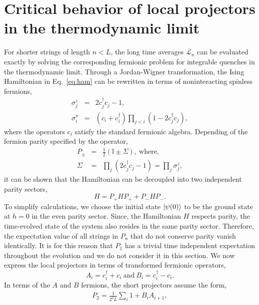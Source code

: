 \documentclass[aps,prx,twocolumn]{revtex4-2}
\begin{document}
{{\section{Critical behavior of local projectors in the thermodynamic limit}
\label{Sec:A3}

For shorter strings of length $n<L$, the long time averages $\overline{\mathcal{L}}_n$ can be evaluated exactly by solving the corresponding fermionic problem for integrable quenches in the thermodynamic limit. Through a Jordan-Wigner transformation, the Ising Hamiltonian in Eq.~\eqref{eq:ham} can be rewritten in terms of noninteracting spinless fermions,
\begin{eqnarray}
	\sigma^z_j&=&2c^{\dagger}_{j}c_j-1,\nonumber\\
	\sigma^x_i&=&\left( c_i+c_i^{\dagger}\right)\prod\limits_{j<i}\left(1-2c_j^{\dagger} c_j\right),
\end{eqnarray}
where the operators $c_i$ satisfy the standard fermionic algebra. Depending of the fermion parity specified by the operator,
\begin{eqnarray}
	P_{\pm}&=&\frac{1}{2}\left(\mathbb{I}\pm\Sigma\right), ~\text{where,}\nonumber\\
	\Sigma&=&\prod\limits_{j}\left(2c_j^{\dagger}c_j-1\right)=\prod\limits_{j}\sigma^z_j,
\end{eqnarray}
it can be shown that the Hamiltonian can be decoupled into two independent parity sectors,
\begin{equation}
	H=P_{+}HP_{+}+P_{-}HP_{-}.
\end{equation}
To simplify calculations, we choose the initial state $\ket{\psi(0)}$ to be the ground state at $h=0$ in the even parity sector. Since, the Hamiltonian $H$ respects parity, the time-evolved state of the system also resides in the same parity sector. Therefore, the expectation value of all strings in $P_n$ that do not conserve parity vanish identically. It is for this reason that $P_1$ has a trivial time independent expectation throughout the evolution and we do not consider it in this section. We now express the local projectors in terms of transformed fermionic operators,
\begin{equation}
	A_i=c_i^{\dagger}+c_i~\text{and}~B_i=c_i^{\dagger}-c_i.
\end{equation}  
In terms of the $A$ and $B$ fermions, the short projectors assume the form,
\begin{equation}\label{eq:Amajorana}
	\begin{split}
		P_2=\frac{1}{2^2L}\sum\limits_{i}1+B_iA_{i+1},\\

\end{split}
\end{equation}}}
\end{document}
